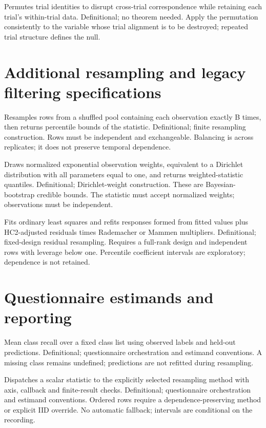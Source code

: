 {Permutes trial identities to disrupt cross-trial correspondence while retaining each trial's within-trial data.}
{Definitional; no theorem needed.}
{Apply the permutation consistently to the variable whose trial alignment is to be destroyed; repeated trial structure defines the null.}


\section{Additional resampling and legacy filtering specifications}
{Resamples rows from a shuffled pool containing each observation exactly B times, then returns percentile bounds of the statistic.}
{Definitional; finite resampling construction.}
{Rows must be independent and exchangeable. Balancing is across replicates; it does not preserve temporal dependence.}

{Draws normalized exponential observation weights, equivalent to a Dirichlet distribution with all parameters equal to one, and returns weighted-statistic quantiles.}
{Definitional; Dirichlet-weight construction.}
{These are Bayesian-bootstrap credible bounds. The statistic must accept normalized weights; observations must be independent.}

{Fits ordinary least squares and refits responses formed from fitted values plus HC2-adjusted residuals times Rademacher or Mammen multipliers.}
{Definitional; fixed-design residual resampling.}
{Requires a full-rank design and independent rows with leverage below one. Percentile coefficient intervals are exploratory; dependence is not retained.}


\section{Questionnaire estimands and reporting}
{Mean class recall over a fixed class list using observed labels and held-out predictions.}
{Definitional; questionnaire orchestration and estimand conventions.}
{A missing class remains undefined; predictions are not refitted during resampling.}

{Dispatches a scalar statistic to the explicitly selected resampling method with axis, callback and finite-result checks.}
{Definitional; questionnaire orchestration and estimand conventions.}
{Ordered rows require a dependence-preserving method or explicit IID override. No automatic fallback; intervals are conditional on the recording.}


